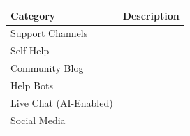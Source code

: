 \documentclass[11pt,openany]{book}
\begin{document}
\begin{longtable}[]{@{}ll@{}}
\toprule
\begin{minipage}[b]{0.26\columnwidth}\raggedright
Category\strut
\end{minipage} & \begin{minipage}[b]{0.68\columnwidth}\raggedright
Description\strut
\end{minipage}\tabularnewline
\midrule
\endhead
\begin{minipage}[t]{0.26\columnwidth}\raggedright
Support Channels\strut
\end{minipage} & \begin{minipage}[t]{0.68\columnwidth}\raggedright
\strut
\end{minipage}\tabularnewline
\begin{minipage}[t]{0.26\columnwidth}\raggedright
Self-Help\strut
\end{minipage} & \begin{minipage}[t]{0.68\columnwidth}\raggedright
\strut
\end{minipage}\tabularnewline
\begin{minipage}[t]{0.26\columnwidth}\raggedright
Community Blog\strut
\end{minipage} & \begin{minipage}[t]{0.68\columnwidth}\raggedright
\strut
\end{minipage}\tabularnewline
\begin{minipage}[t]{0.26\columnwidth}\raggedright
Help Bots\strut
\end{minipage} & \begin{minipage}[t]{0.68\columnwidth}\raggedright
\strut
\end{minipage}\tabularnewline
\begin{minipage}[t]{0.26\columnwidth}\raggedright
Live Chat (AI-Enabled)\strut
\end{minipage} & \begin{minipage}[t]{0.68\columnwidth}\raggedright
\strut
\end{minipage}\tabularnewline
\begin{minipage}[t]{0.26\columnwidth}\raggedright
Social Media\strut
\end{minipage} & \begin{minipage}[t]{0.68\columnwidth}\raggedright
\strut
\end{minipage}\tabularnewline
\bottomrule
\end{longtable}
\end{document}
